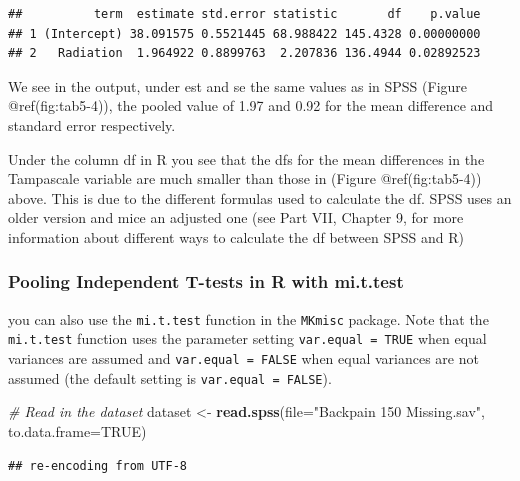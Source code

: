\documentclass[
]{book}
\newenvironment{Shaded}{\begin{snugshade}}{\end{snugshade}}
\newcommand{\CommentTok}[1]{\textcolor[rgb]{0.56,0.35,0.01}{\textit{#1}}}
\newcommand{\DataTypeTok}[1]{\textcolor[rgb]{0.13,0.29,0.53}{#1}}
\newcommand{\KeywordTok}[1]{\textcolor[rgb]{0.13,0.29,0.53}{\textbf{#1}}}
\newcommand{\NormalTok}[1]{#1}
\newcommand{\OtherTok}[1]{\textcolor[rgb]{0.56,0.35,0.01}{#1}}
\newcommand{\StringTok}[1]{\textcolor[rgb]{0.31,0.60,0.02}{#1}}
\begin{document}
\begin{verbatim}
##          term  estimate std.error statistic       df    p.value
## 1 (Intercept) 38.091575 0.5521445 68.988422 145.4328 0.00000000
## 2   Radiation  1.964922 0.8899763  2.207836 136.4944 0.02892523
\end{verbatim}

We see in the output, under est and se the same values as in SPSS
(Figure @ref(fig:tab5-4)), the pooled value of 1.97 and 0.92 for the
mean difference and standard error respectively.

Under the column df in R you see that the dfs for the mean differences
in the Tampascale variable are much smaller than those in (Figure
@ref(fig:tab5-4)) above. This is due to the different formulas used to
calculate the df. SPSS uses an older version and mice an adjusted one
(see Part VII, Chapter 9, for more information about different ways to
calculate the df between SPSS and R)

\hypertarget{pooling-independent-t-tests-in-r-with-mi.t.test}{%
\subsubsection{Pooling Independent T-tests in R with
mi.t.test}\label{pooling-independent-t-tests-in-r-with-mi.t.test}}

you can also use the \texttt{mi.t.test} function in the \texttt{MKmisc}
package. Note that the \texttt{mi.t.test} function uses the parameter
setting \texttt{var.equal\ =\ TRUE} when equal variances are assumed and
\texttt{var.equal\ =\ FALSE} when equal variances are not assumed (the
default setting is \texttt{var.equal\ =\ FALSE}).

\begin{Shaded}
\begin{Highlighting}[]
\CommentTok{# Read in the dataset}
\NormalTok{dataset <-}\StringTok{ }\KeywordTok{read.spss}\NormalTok{(}\DataTypeTok{file=}\StringTok{"Backpain 150 Missing.sav"}\NormalTok{, }\DataTypeTok{to.data.frame=}\OtherTok{TRUE}\NormalTok{)}
\end{Highlighting}
\end{Shaded}

\begin{verbatim}
## re-encoding from UTF-8
\end{verbatim}
\end{document}
